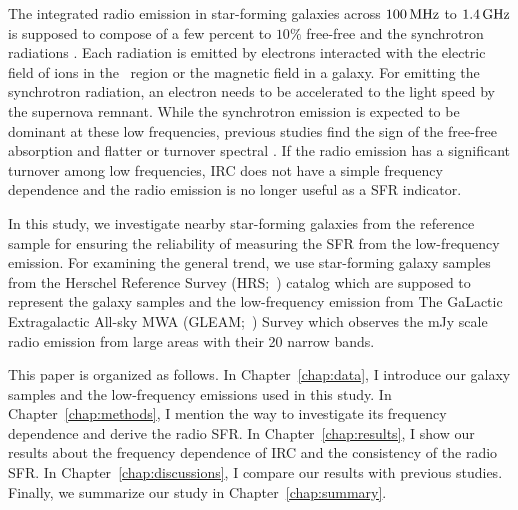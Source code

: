 The integrated radio emission in star-forming galaxies across $100\,\mathrm{MHz}$ to $1.4\,\mathrm{GHz}$ is supposed to compose of a few percent to $10\%$ free-free and the synchrotron radiations \citep{Condon1992a}.
Each radiation is emitted by electrons interacted with the electric field of ions in the \ih~region or the magnetic field in a galaxy.
For emitting the synchrotron radiation, an electron needs to be accelerated to the light speed by the supernova remnant.
While the synchrotron emission is expected to be dominant at these low frequencies, previous studies find the sign of the free-free absorption and flatter or turnover spectral \citep{Schober2017, Chyzy2018}.
If the radio emission has a significant turnover among low frequencies, IRC does not have a simple frequency dependence and the radio emission is no longer useful as a SFR indicator.

In this study, we investigate nearby star-forming galaxies from the reference sample for ensuring the reliability of measuring the SFR from the low-frequency emission.
For examining the general trend, we use star-forming galaxy samples from the Herschel Reference Survey (HRS;~\citealt{Boselli2010}) catalog which are supposed to represent the galaxy samples and the low-frequency emission from The GaLactic Extragalactic All-sky MWA (GLEAM;~\citealt{Hurley-Walker2017a}) Survey which observes the mJy scale radio emission from large areas with their 20 narrow bands.

This paper is organized as follows.
In Chapter~\ref{chap:data}, I introduce our galaxy samples and the low-frequency emissions used in this study.
In Chapter~\ref{chap:methods}, I mention the way to investigate its frequency dependence and derive the radio SFR\@.
In Chapter~\ref{chap:results}, I show our results about the frequency dependence of IRC and the consistency of the radio SFR\@.
In Chapter~\ref{chap:discussions}, I compare our results with previous studies.
Finally, we summarize our study in Chapter~\ref{chap:summary}.



%
%




